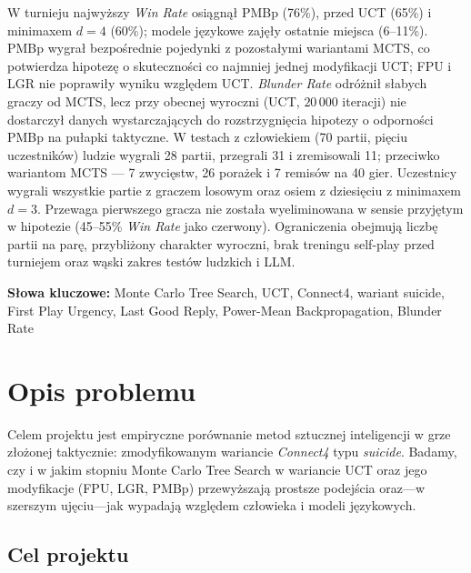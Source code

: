 \documentclass[11pt, a4paper]{article}
\begin{document}
W turnieju najwyższy \textit{Win Rate} osiągnął PMBp (76\%), przed UCT (65\%) i minimaxem $d{=}4$ (60\%); modele językowe zajęły ostatnie miejsca (6--11\%). PMBp wygrał bezpośrednie pojedynki z pozostałymi wariantami MCTS, co potwierdza hipotezę o skuteczności co najmniej jednej modyfikacji UCT; FPU i LGR nie poprawiły wyniku względem UCT. \textit{Blunder Rate} odróżnił słabych graczy od MCTS, lecz przy obecnej wyroczni (UCT, $20\,000$ iteracji) nie dostarczył danych wystarczających do rozstrzygnięcia hipotezy o odporności PMBp na pułapki taktyczne. W testach z człowiekiem (70 partii, pięciu uczestników) ludzie wygrali 28 partii, przegrali 31 i zremisowali 11; przeciwko wariantom MCTS --- 7 zwycięstw, 26 porażek i 7 remisów na 40 gier. Uczestnicy wygrali wszystkie partie z graczem losowym oraz osiem z dziesięciu z minimaxem $d{=}3$. Przewaga pierwszego gracza nie została wyeliminowana w sensie przyjętym w hipotezie (45--55\% \textit{Win Rate} jako czerwony). Ograniczenia obejmują liczbę partii na parę, przybliżony charakter wyroczni, brak treningu self-play przed turniejem oraz wąski zakres testów ludzkich i LLM.

\vspace{0.5cm}
\noindent\textbf{Słowa kluczowe:}
Monte Carlo Tree Search, UCT, Connect4, wariant suicide, First Play Urgency, Last Good Reply, Power-Mean Backpropagation, Blunder Rate

\tableofcontents
\newpage

\section{Opis problemu}

Celem projektu jest empiryczne porównanie metod sztucznej inteligencji w grze złożonej taktycznie: zmodyfikowanym wariancie \textit{Connect4} typu \textit{suicide}. Badamy, czy i w jakim stopniu Monte Carlo Tree Search w wariancie UCT oraz jego modyfikacje (FPU, LGR, PMBp) przewyższają prostsze podejścia oraz---w szerszym ujęciu---jak wypadają względem człowieka i modeli językowych.

\subsection{Cel projektu}
\end{document}
